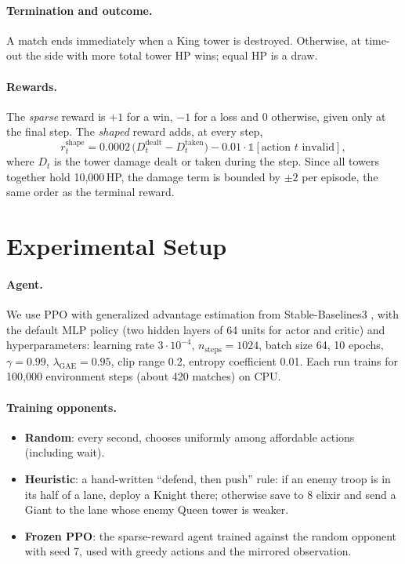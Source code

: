 \documentclass[11pt]{article}
\begin{document}
\paragraph{Termination and outcome.}
A match ends immediately when a King tower is destroyed. Otherwise, at
time-out the side with more total tower HP wins; equal HP is a draw.

\paragraph{Rewards.}
The \emph{sparse} reward is $+1$ for a win, $-1$ for a loss and $0$ otherwise,
given only at the final step. The \emph{shaped} reward adds, at every step,
\begin{equation}
  r^{\text{shape}}_t = 0.0002\,\big(D^{\text{dealt}}_t - D^{\text{taken}}_t\big)
  - 0.01\cdot\mathbb{1}[\text{action $t$ invalid}],
\end{equation}
where $D_t$ is the tower damage dealt or taken during the step. Since all
towers together hold 10{,}000\,HP, the damage term is bounded by $\pm 2$ per
episode, the same order as the terminal reward.

\section{Experimental Setup}
\label{sec:setup}

\paragraph{Agent.}
We use PPO \citep{schulman2017ppo} with generalized advantage estimation
\citep{schulman2016gae} from Stable-Baselines3 \citep{raffin2021sb3}, with the
default MLP policy (two hidden layers of 64 units for actor and critic) and
hyperparameters: learning rate $3\cdot10^{-4}$, $n_\text{steps}=1024$, batch
size 64, 10 epochs, $\gamma=0.99$, $\lambda_\text{GAE}=0.95$, clip range 0.2,
entropy coefficient 0.01. Each run trains for 100{,}000 environment steps
(about 420 matches) on CPU.

\paragraph{Training opponents.}
\begin{itemize}
  \item \textbf{Random}: every second, chooses uniformly among affordable actions (including wait).
  \item \textbf{Heuristic}: a hand-written ``defend, then push'' rule: if an
  enemy troop is in its half of a lane, deploy a Knight there; otherwise save
  to 8 elixir and send a Giant to the lane whose enemy Queen tower is weaker.
  \item \textbf{Frozen PPO}: the sparse-reward agent trained against the
  random opponent with seed 7, used with greedy actions and the mirrored
  observation.
\end{itemize}
\end{document}
